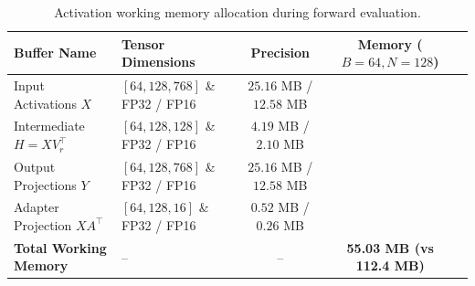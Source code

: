 \begin{table}[H]
\centering
\small
\begin{tabularx}{\linewidth}{llccc}
\toprule
\textbf{Buffer Name} & \textbf{Tensor Dimensions} & \textbf{Precision} & \textbf{Memory ($B=64, N=128$)} \\
\midrule
Input Activations $X$ & $[64, 128, 768]$ \& FP32 / FP16 & $25.16$ MB / $12.58$ MB \\
Intermediate $H = X V_r^\top$ & $[64, 128, 128]$ \& FP32 / FP16 & $4.19$ MB / $2.10$ MB \\
Output Projections $Y$ & $[64, 128, 768]$ \& FP32 / FP16 & $25.16$ MB / $12.58$ MB \\
Adapter Projection $X A^\top$ & $[64, 128, 16]$ \& FP32 / FP16 & $0.52$ MB / $0.26$ MB \\
\midrule
\textbf{Total Working Memory} & -- & -- & \textbf{55.03 MB (vs 112.4 MB)} \\
\bottomrule
\end{tabularx}
\caption{Activation working memory allocation during forward evaluation.}
\end{table}
